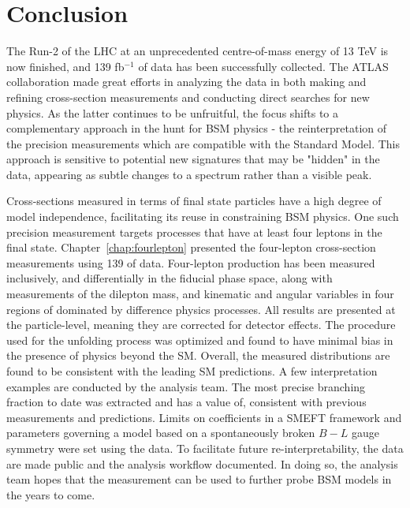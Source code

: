 \chapter{Conclusion}
\label{chap:conclusion}

The Run-2 of the LHC at an unprecedented centre-of-mass energy of 13 TeV is now finished, and 139 fb$^{-1}$ of data has been successfully collected. The ATLAS collaboration made great efforts in analyzing the data in both making and refining cross-section measurements and conducting direct searches for new physics. As the latter continues to be unfruitful, the focus shifts to a complementary approach in the hunt for BSM physics - the reinterpretation of the precision measurements which are compatible with the Standard Model. This approach is sensitive to potential new signatures that may be "hidden" in the data, appearing as subtle changes to a spectrum rather than a visible peak. 

Cross-sections measured in terms of final state particles have a high degree of model independence, facilitating its reuse in constraining BSM physics. One such precision measurement targets processes that have at least four leptons in the final state. Chapter~\ref{chap:fourlepton} presented the \ATLAS four-lepton cross-section measurements using \unit{139}{\invfb} of data. Four-lepton production has been measured inclusively, and differentially in the fiducial phase space, along with measurements of the dilepton mass, and kinematic and angular variables in four regions of \mFourL{} dominated by difference physics processes. All results are presented at the particle-level, meaning they are corrected for detector effects. The procedure used for the unfolding process was optimized and found to have minimal bias in the presence of physics beyond the SM. Overall, the measured distributions are found to be consistent with the leading SM predictions. A few interpretation examples are conducted by the analysis team. The most precise \ZFourL{} branching fraction to date was extracted and has a value of, consistent with previous measurements and predictions. Limits on coefficients in a SMEFT framework and parameters governing a model based on a spontaneously broken $B-L$ gauge symmetry were set using the data. To facilitate future re-interpretability, the data are made public and the analysis workflow documented. In doing so, the analysis team hopes that the measurement can be used to further probe BSM models in the years to come.

